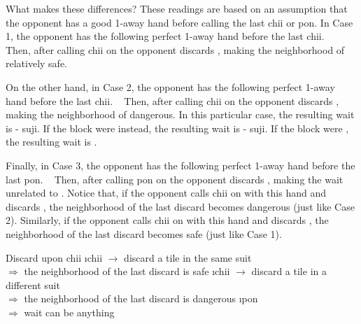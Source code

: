 {{\bigskip
What makes these differences? 
These readings are based on an assumption that the opponent has a good 1-away  hand before calling the last {\jap chii} or {\jap pon}. In Case 1, the opponent has the following perfect 1-away hand before the last {\jap chii}. 
\bp
{}
~\rfa\fa\fa
\ep {}
Then, after calling {\jap chii} on {\LARGE{}} the opponent discards {\LARGE{}}, making the neighborhood of {\LARGE{}} relatively safe. 

\bigskip
On the other hand, in Case 2, the opponent has the following perfect 1-away hand before the last {\jap chii}. 
\bp
{}
~\rfa\fa\fa
\ep
Then, after calling {\jap chii} on {\LARGE{}} the opponent discards {\LARGE{}}, making the neighborhood of {\LARGE{}} dangerous. In this particular case, the resulting wait is {\LARGE{}-} {\jap suji}. If the {\LARGE{}} block were {\LARGE{}} instead, the resulting wait is {\LARGE{}-} {\jap suji}.  If the {\LARGE{}} block were {\LARGE{}}, the resulting wait is {\LARGE{}}. 

\bigskip
Finally, in Case 3, the opponent has the following perfect 1-away hand before the last {\jap pon}. 
\bp
{}
~\rfa\fa\fa
\ep
Then, after calling {\jap pon} on {\LARGE{}} the opponent discards {\LARGE{}}, making the wait unrelated to {\LARGE{}}. Notice that, if the opponent calls {\jap chii} on {\LARGE{}} with this hand and discards {\LARGE{}}, the neighborhood of the last discard becomes dangerous (just like Case 2). Similarly, if the opponent calls {\jap chii} on {\LARGE{}} with this hand and discards {\LARGE{}}, the neighborhood of the last discard becomes safe (just like Case 1). 

\bigskip
\begin{itembox}[c]{Discard upon {\jap chii}}
\bi
\i {\jap chii} $\rightarrow$ discard a tile in the same suit \\
	$\Rightarrow$ the neighborhood of the last discard is {\large safe}
\i {\jap chii} $\rightarrow$ discard a tile in a different suit \\
	$\Rightarrow$ the neighborhood of the last discard is {\large dangerous}
\i {\jap pon} \\
	$\Rightarrow$ wait can be anything
\ei
\vsps
\end{itembox}

}}
